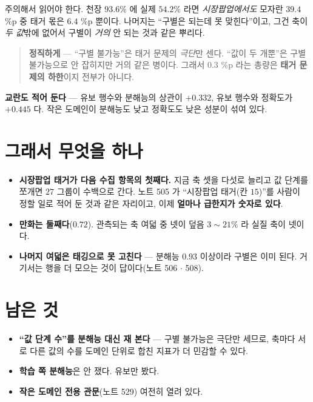 \documentclass[11pt]{article}
\begin{document}
주의해서 읽어야 한다. 천장 $93.6\%$ 에 실제 $54.2\%$ 라면 \emph{시장팝업에서도}
모자란 $39.4$ \%p 중 태거 몫은 $6.4$ \%p 뿐이다. 나머지는 ``구별은 되는데 못
맞힌다''이고, 그건 축이 \emph{두 값}밖에 없어서 구별이 \emph{거의} 안 되는
것과 같은 뿌리다.

\begin{quote}
\textbf{정직하게} --- ``구별 불가능''은 태거 문제의 \emph{극단}만 센다.
``값이 두 개뿐''은 구별 불가능으로 안 잡히지만 거의 같은 병이다. 그래서
$0.3$ \%p 라는 총량은 \textbf{태거 문제의 하한}이지 전부가 아니다.
\end{quote}

\textbf{교란도 적어 둔다} --- 유보 행수와 분해능의 상관이 $+0.332$, 유보 행수와
정확도가 $+0.445$ 다. 작은 도메인이 분해능도 낮고 정확도도 낮은 성분이 섞여
있다.

\section*{그래서 무엇을 하나}

\begin{itemize}
\item \textbf{시장팝업 태거가 다음 수집 항목의 첫째다.} 지금 축 셋을 다섯로
늘리고 값 단계를 쪼개면 $27$ 그룹이 수백으로 간다. 노트 505 가 ``시장팝업
태거(칸 $15$)''를 사람이 정할 일로 적어 둔 것과 같은 자리이고, 이제
\textbf{얼마나 급한지가 숫자로 있다}.
\item \textbf{만화는 둘째다}($0.72$). 관측되는 축 여덟 중 넷이 덮음
$3\!\sim\!21\%$ 라 실질 축이 넷이다.
\item \textbf{나머지 여덟은 태깅으로 못 고친다} --- 분해능 $0.93$ 이상이라
구별은 이미 된다. 거기서는 행을 더 모으는 것이 답이다(노트 506 $\cdot$ 508).
\end{itemize}

\section*{남은 것}

\begin{itemize}
\item \textbf{``값 단계 수''를 분해능 대신 재 본다} --- 구별 불가능은 극단만
세므로, 축마다 서로 다른 값의 수를 도메인 단위로 합친 지표가 더 민감할 수 있다.
\item \textbf{학습 쪽 분해능}은 안 쟀다. 유보만 봤다.
\item \textbf{작은 도메인 전용 관문}(노트 529) 여전히 열려 있다.
\end{itemize}
\end{document}
